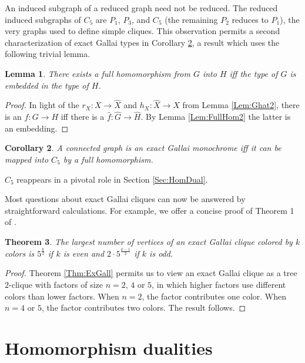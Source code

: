 \documentclass[12pt]{amsart}
\newtheorem{theorem}{Theorem}[section]
\theoremstyle{plain}
\newtheorem{corollary}[theorem]{Corollary}
\newtheorem{lemma}[theorem]{Lemma}
\numberwithin{equation}{section}
\begin{document}
An induced subgraph of a reduced graph need not be reduced. The reduced induced
subgraphs of $C_{5}$ are $P_{1}$, $P_{3}$, and $C_{5}$ (the remaining $P_{2}$
reduces to $P_{1}$), the very graphs used to define simple cliques. This
observation permits a second characterization of exact Gallai types in
Corollary \ref{Cor:GallC5}, a result which uses the following trivial lemma.

\begin{lemma}
\label{Lem:Type}There exists a full homomorphism from $G$ into $H$ iff the
type of $G$ is embedded in the type of $H$.
\end{lemma}

\begin{proof}
In light of the $r_{X}:X \to \widehat{X}$ and $h_{X}: \widehat{X} \to X$ from
Lemma \ref{Lem:Ghat2}, there is an $f:G\to H$ iff there is a
$\widehat{f}:\widehat{G}\to\widehat{H}$. By Lemma \ref{Lem:FullHom2} the latter
is an embedding.
\end{proof}

\begin{corollary}
\label{Cor:GallC5}A connected graph is an exact Gallai monochrome iff it can
be mapped into $C_{5}$ by a full homomorphism.
\end{corollary}

$C_{5}$ reappears in a pivotal role in Section \ref{Sec:HomDual}.

Most questions about exact Gallai cliques can now be answered by
straightforward calculations. For example, we offer a concise proof of Theorem
1 of \cite{ChungGraham:1983}.

\begin{theorem}
\label{Thm:VerBnd}The largest number of vertices of an exact Gallai clique
colored by $k$ colors is $5^{\frac{k}{2}}$ if $k$ is even and $2\cdot
5^{\frac{k-1}{2}}$ if $k$ is odd.
\end{theorem}

\begin{proof}
Theorem \ref{Thm:ExGall} permits us to view an exact Gallai clique as a tree
$2$-clique with factors of size $n=2$, $4$ or $5$, in which higher factors use
different colors than lower factors. When $n=2$, the factor contributes one
color. When $n=4$ or $5$, the factor contributes two colors. The result
follows.
\end{proof}


\section{Homomorphism dualities\label{Sec:HomDual}}
\end{document}
